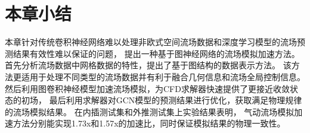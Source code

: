 \section{本章小结}

本章针对传统卷积神经网络难以处理非欧式空间流场数据和深度学习模型的流场预测结果有效性难以保证的问题，
提出一种基于图神经网络的流场模拟加速方法。
首先分析流场数据中网格数据的特性，提出了基于图结构的数据表示方法。
该方法更适用于处理不同类型的流场数据并有利于融合几何信息和流场全局控制信息。
然后利用图卷积神经模型加速流场模拟，为CFD求解器快速提供了更接近收敛状态的初场，
最后利用求解器对GCN模型的预测结果进行优化，获取满足物理规律的流场模拟结果。
在内插测试集和外推测试集上实验结果表明，
气动流场模拟加速方法分别能实现1.73x和1.57x的加速比，同时保证模拟结果的物理一致性。



